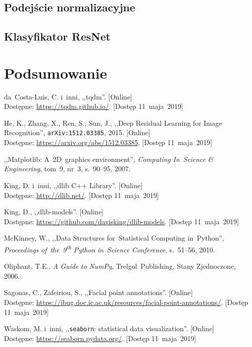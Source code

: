 \documentclass[11pt,a4paper]{article}
\begin{document}
\subsection{Podejście normalizacyjne}

\subsection{Klasyfikator ResNet}

\section{Podsumowanie}

\begin{thebibliography}{9}

        da~Costa-Luis, C. i~inni,
        ,,tqdm''.
        [Online]
        \\
        Dostępne: \url{https://tqdm.github.io/}.
        [Dostęp 11~maja~2019]

        He, K.,
        Zhang, X.,
        Ren, S.,
        Sun, J.,
        ,,Deep Residual Learning for Image Recognition'',
        {\tt arXiv:1512.03385},
        2015.
        [Online]
        \\
        Dostępne: \url{https://arxiv.org/abs/1512.03385}.
        [Dostęp 11~maja~2019]

        ,,Matplotlib: A~2D~graphics environment'',
        \emph{Computing In~Science \& Engineering},
        tom~9,
        nr~3,
        s.~90--95,
        2007.

        King, D. i~inni,
        ,,dlib C++ Library''.
        [Online]
        \\
        Dostępne: \url{http://dlib.net/}.
        [Dostęp 11~maja~2019]

        King, D.,
        ,,dlib-models''.
        [Online]
        \\
        Dostępne: \url{https://github.com/davisking/dlib-models}.
        [Dostęp 11~maja~2019]

        McKinney, W.,
        ,,Data Structures for~Statistical Computing in~Python'',
        \emph{Proceedings of~the~9\textsuperscript{th} Python in~Science Conference},
        s.~51--56,
        2010.

        Oliphant, T.E.,
        \emph{A Guide to NumPy},
        Trelgol~Publishing,
        Stany Zjednoczone,
        2006.

        Sagonas, C.,
        Zafeiriou, S.,
        ,,Facial point annotations''.
        [Online]
        \\
        Dostępne: \url{https://ibug.doc.ic.ac.uk/resources/facial-point-annotations/}.
        [Dostęp 11~maja~2019]

        Waskom, M. i~inni,
        ,,\texttt{seaborn}: statistical data visualization''.
        [Online]
        \\
        Dostępne: \url{https://seaborn.pydata.org/}.
        [Dostęp 11~maja~2019]

\end{thebibliography}
\end{document}
